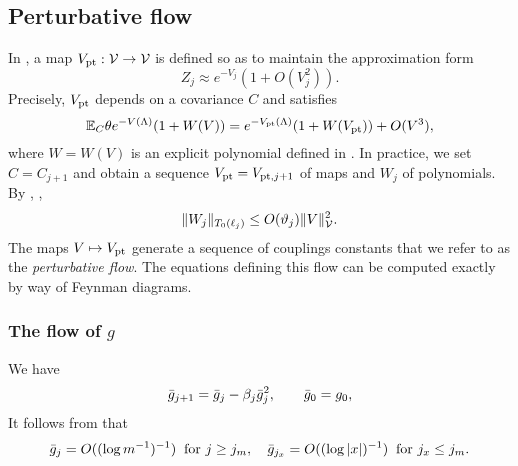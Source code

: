 
\subsection{Perturbative flow}

In \cite{BBS-rg-pt}, a map $V_{\rm pt} : \mathcal{V}\rightarrow\mathcal{V}$
is defined so as to maintain the approximation form
\begin{equation}
Z_j \approx e^{-V_j} (1 + O(V_j^2)).
\end{equation}
Precisely, $V_{\rm pt}$ depends on a covariance $C$ and satisfies
\begin{equation}
\mathbb{E}_C\theta e^{-V(\Lambda)} (1 + W(V))
	=
e^{-V_{\rm pt}(\Lambda)} (1 + W(V_{\rm pt})) + O(V^3),
\end{equation}
where $W = W(V)$ is an explicit polynomial defined
in \cite[\eqref{pt-e:WLTF}]{BBS-rg-pt}. 
In practice, we set $C = C_{j+1}$ and obtain a sequence $V_{\rm pt} = V_{\mathrm{pt},j+1}$
of maps and $W_j$ of polynomials. By \cite[\eqref{IE-e:W-logwish}]{BS-rg-IE},
,
\begin{equation}
\label{e:Wbilinbd}
\|W_j\|_{T_0(\ell_j)}
	\le
O(\vartheta_j) \|V\|_{\mathcal{V}}^2.
\end{equation}
The maps $V \mapsto V_{\rm pt}$
generate a sequence of couplings constants that we refer to as the
\emph{perturbative flow}. The equations defining this flow can be
computed exactly by way of Feynman diagrams.

\subsubsection{The flow of \texorpdfstring{$g$}{g}}

We have
\begin{equation} \label{e:gbar}
\bar{g}_{j+1}
	=
\bar{g}_j - \beta_j  \bar{g}_j^{2}, \qquad \bar{g}_0
	=
g_0,
\end{equation}
It follows from \cite[Proposition~\ref{log-prop:approximate-flow}]{BBS-saw4-log}
that
\begin{equation}
\label{e:gjxgjmbd}
\bar{g}_{j}
	=
O((\log m^{-1})^{-1}) \;\; \text{for $j \geq j_m$},
	\quad
\bar{g}_{j_x}
	=
O((\log |x|)^{-1}) \;\; \text{for $j_x \leq j_m$.}
\end{equation}


